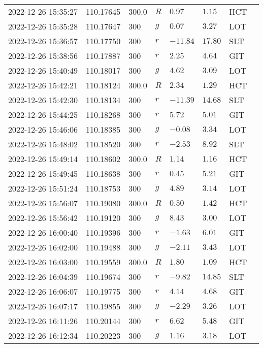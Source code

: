 \documentclass{nature_plusfigure}
\begin{document}
\begin{supplement}
\begin{center}
\begin{longtable}{llllllll}
2022-12-26 15:35:27 & 110.17645 & 300.0 & $R$ & $0.97$ & $1.15$ & HCT &  \\ 
2022-12-26 15:35:28 & 110.17647 & 300 & $g$ & $0.07$ & $3.27$ & LOT &  \\ 
2022-12-26 15:36:57 & 110.17750 & 300 & $r$ & $-11.84$ & $17.80$ & SLT &  \\ 
2022-12-26 15:38:56 & 110.17887 & 300 & $r$ & $2.25$ & $4.64$ & GIT &  \\ 
2022-12-26 15:40:49 & 110.18017 & 300 & $g$ & $4.62$ & $3.09$ & LOT &  \\ 
2022-12-26 15:42:21 & 110.18124 & 300.0 & $R$ & $2.34$ & $1.29$ & HCT &  \\ 
2022-12-26 15:42:30 & 110.18134 & 300 & $r$ & $-11.39$ & $14.68$ & SLT &  \\ 
2022-12-26 15:44:25 & 110.18268 & 300 & $r$ & $5.72$ & $5.01$ & GIT &  \\ 
2022-12-26 15:46:06 & 110.18385 & 300 & $g$ & $-0.08$ & $3.34$ & LOT &  \\ 
2022-12-26 15:48:02 & 110.18520 & 300 & $r$ & $-2.53$ & $8.92$ & SLT &  \\ 
2022-12-26 15:49:14 & 110.18602 & 300.0 & $R$ & $1.14$ & $1.16$ & HCT &  \\ 
2022-12-26 15:49:45 & 110.18638 & 300 & $r$ & $0.45$ & $5.21$ & GIT &  \\ 
2022-12-26 15:51:24 & 110.18753 & 300 & $g$ & $4.89$ & $3.14$ & LOT &  \\ 
2022-12-26 15:56:07 & 110.19080 & 300.0 & $R$ & $0.50$ & $1.42$ & HCT &  \\ 
2022-12-26 15:56:42 & 110.19120 & 300 & $g$ & $8.43$ & $3.00$ & LOT &  \\ 
2022-12-26 16:00:40 & 110.19396 & 300 & $r$ & $-1.63$ & $6.01$ & GIT &  \\ 
2022-12-26 16:02:00 & 110.19488 & 300 & $g$ & $-2.11$ & $3.43$ & LOT &  \\ 
2022-12-26 16:03:00 & 110.19559 & 300.0 & $R$ & $1.80$ & $1.09$ & HCT &  \\ 
2022-12-26 16:04:39 & 110.19674 & 300 & $r$ & $-9.82$ & $14.85$ & SLT &  \\ 
2022-12-26 16:06:07 & 110.19775 & 300 & $r$ & $4.14$ & $4.68$ & GIT &  \\ 
2022-12-26 16:07:17 & 110.19855 & 300 & $g$ & $-2.29$ & $3.26$ & LOT &  \\ 
2022-12-26 16:11:26 & 110.20144 & 300 & $r$ & $6.62$ & $5.48$ & GIT &  \\ 
2022-12-26 16:12:34 & 110.20223 & 300 & $g$ & $1.16$ & $3.18$ & LOT &  \\ 

\end{longtable}
\end{center}
\end{supplement}
\end{document}
